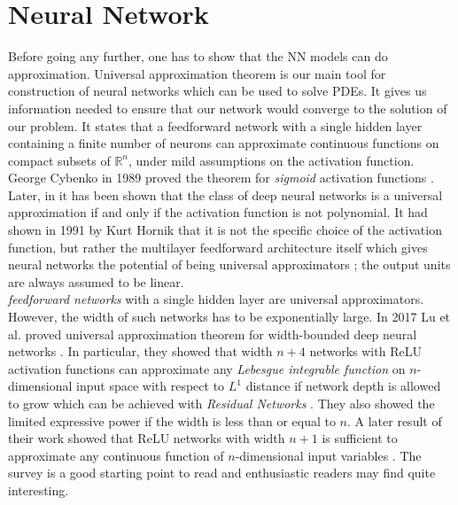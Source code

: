 \section{Neural Network}\label{sec:neural_network}
Before going any further, one has to show that the NN models can do approximation. Universal approximation theorem is our main tool for construction of neural networks which can be used to solve PDEs. It gives us information needed to ensure that our network would converge to the solution of our problem. It states that a feedforward network with a single hidden layer containing a finite number of neurons can approximate continuous functions on compact subsets of $\mathbb{R}^n$, under mild assumptions on the activation function. George Cybenko in 1989 proved the theorem for \textit{sigmoid} activation functions \cite{cybenko1989approximation}. Later, in \cite{li1999alpha} it has been shown that the class of deep neural networks is a universal approximation if and only if the activation function is not polynomial. It had shown in 1991 by Kurt Hornik  that it is not the specific choice of the activation function, but rather the multilayer feedforward architecture itself which gives neural networks the potential of being universal approximators \cite{hofbauer1990adaptive}; the output units are always assumed to be linear. \\
\textit{feedforward networks} with a single hidden layer are universal approximators. However, the width of such networks has to be exponentially large. In 2017 Lu et al. proved universal approximation theorem for width-bounded deep neural networks \cite{lu2017expressive}. In particular, they showed that width $n+4$ networks with ReLU activation functions can approximate any \textit{Lebesgue integrable function} on $n$-dimensional input space with respect to $L^{1}$ distance if network depth is allowed to grow which can be achieved with \textit{Residual Networks} \cite{he2016deep, lin2018resnet}. They also showed the limited expressive power if the width is less than or equal to $n$. A later result of their work showed that ReLU networks with width $n+1$ is sufficient to approximate any continuous function of $n$-dimensional input variables \cite{hanin2017approximating}. The survey \cite{tikk2003survey} is a good starting point to read and enthusiastic readers may find \cite{kratsios2019universal} quite interesting.
